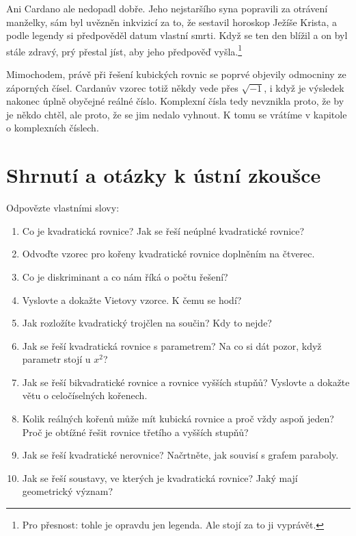 Ani Cardano ale nedopadl dobře. Jeho nejstaršího syna popravili za otrávení manželky, sám byl uvězněn inkvizicí za to, že sestavil horoskop Ježíše Krista, a podle legendy si předpověděl datum vlastní smrti. Když se ten den blížil a on byl stále zdravý, prý přestal jíst, aby jeho předpověď vyšla.\footnote{Pro přesnost: tohle je opravdu jen legenda. Ale stojí za to ji vyprávět.}

Mimochodem, právě při řešení kubických rovnic se poprvé objevily odmocniny ze záporných čísel. Cardanův vzorec totiž někdy vede přes $\sqrt{-1}$, i když je výsledek nakonec úplně obyčejné reálné číslo. Komplexní čísla tedy nevznikla proto, že by je někdo chtěl, ale proto, že se jim nedalo vyhnout. K tomu se vrátíme v kapitole o komplexních číslech.

\section{Shrnutí a otázky k ústní zkoušce}

\begin{problem}
  Odpovězte vlastními slovy:
  \begin{enumerate}
    \item Co je kvadratická rovnice? Jak se řeší neúplné kvadratické rovnice?
    \item Odvoďte vzorec pro kořeny kvadratické rovnice doplněním na čtverec.
    \item Co je diskriminant a co nám říká o počtu řešení?
    \item Vyslovte a dokažte Vietovy vzorce. K čemu se hodí?
    \item Jak rozložíte kvadratický trojčlen na součin? Kdy to nejde?
    \item Jak se řeší kvadratická rovnice s parametrem? Na co si dát pozor, když parametr stojí u $x^2$?
    \item Jak se řeší bikvadratické rovnice a rovnice vyšších stupňů? Vyslovte a dokažte větu o celočíselných kořenech.
    \item Kolik reálných kořenů může mít kubická rovnice a proč vždy aspoň jeden? Proč je obtížné řešit rovnice třetího a vyšších stupňů?
    \item Jak se řeší kvadratické nerovnice? Načrtněte, jak souvisí s grafem paraboly.
    \item Jak se řeší soustavy, ve kterých je kvadratická rovnice? Jaký mají geometrický význam?
  \end{enumerate}
\end{problem}
